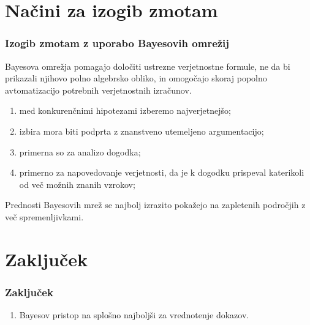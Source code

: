 \documentclass{beamer}
\begin{document}
\section{Načini za izogib zmotam}

\begin{frame}
   \frametitle{Izogib zmotam z uporabo Bayesovih omrežij}
   \begin{block}{}
       Bayesova omrežja pomagajo določiti ustrezne verjetnostne formule, ne da bi prikazali njihovo polno algebrsko obliko, in omogočajo skoraj popolno avtomatizacijo potrebnih verjetnostnih izračunov.
   \end{block} \vspace{3mm}
   \begin{enumerate}
       \item med konkurenčnimi hipotezami izberemo najverjetnejšo;
       \item izbira mora biti podprta z znanstveno utemeljeno argumentacijo;
       \item primerna so za analizo dogodka;
       \item primerno za napovedovanje verjetnosti, da je k dogodku prispeval katerikoli od več možnih znanih vzrokov;
   \end{enumerate}
   \begin{block}{}
       Prednosti Bayesovih mrež se najbolj izrazito pokažejo na zapletenih področjih z več spremenljivkami.
   \end{block}
\end{frame}

\section{Zaključek}

\begin{frame}
   \frametitle{Zaključek}
   \begin{enumerate}
      \item Bayesov pristop na splošno najboljši za vrednotenje dokazov.
   \end{enumerate}
\end{frame}
\end{document}
